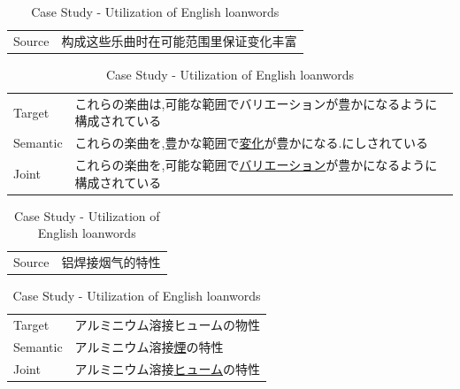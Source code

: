 \vspace{0.15cm}
\begin{table}[h]
    \centering

    \begin{CJK}{UTF8}{gbsn}
        \begin{tabularx}{\textwidth}{p{1.2cm}b}\toprule
            Source & 构成这些乐曲时在可能范围里保证变化丰富 \\
        \end{tabularx}
    \end{CJK}

    \begin{CJK}{UTF8}{ipxm}
        \begin{tabularx}{\textwidth}{p{1.2cm}b}
            Target & これらの楽曲は,可能な範囲でバリエーションが豊かになるように構成されている \\
            Semantic & これらの楽曲を,豊かな範囲で\underline{変化}が豊かになる.にしされている \\
            Joint & これらの楽曲を,可能な範囲で\underline{バリエーション}が豊かになるように構成されている \\\midrule
        \end{tabularx}
    \end{CJK}

    \begin{CJK}{UTF8}{gbsn}
        \begin{tabularx}{\textwidth}{p{1.2cm}b}
            Source & 铝焊接烟气的特性 \\
        \end{tabularx}
    \end{CJK}

    \begin{CJK}{UTF8}{ipxm}
        \begin{tabularx}{\textwidth}{p{1.2cm}b}
            Target & アルミニウム溶接ヒュームの物性 \\
            Semantic & アルミニウム溶接\underline{煙}の特性 \\
            Joint & アルミニウム溶接\underline{ヒューム}の特性 \\\midrule
        \end{tabularx}
    \end{CJK}
    \caption{Case Study - Utilization of English loanwords}
    \label{tab:case_study2}
\end{table}

